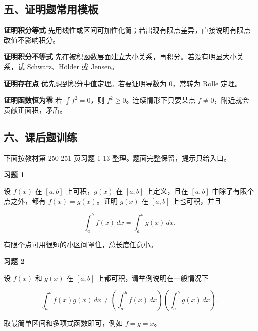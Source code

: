 \subsection*{五、证明题常用模板}

\begin{conceptbox}
\textbf{证明积分等式}
先用线性或区间可加性化简；若出现有限点差异，直接说明有限点改值不影响积分。
\end{conceptbox}

\begin{conceptbox}
\textbf{证明积分不等式}
先在被积函数层面建立大小关系，再积分。若没有明显大小关系，试 Schwarz、Hölder 或 Jensen。
\end{conceptbox}

\begin{conceptbox}
\textbf{证明存在点}
优先想到积分中值定理。若要证明导数为 \(0\)，常转为 Rolle 定理。
\end{conceptbox}

\begin{conceptbox}
\textbf{证明函数恒为零}
若 \(\int f^2=0\)，则 \(f^2\ge0\)。连续情形下只要某点 \(f\ne0\)，附近就会贡献正面积，矛盾。
\end{conceptbox}

\subsection*{六、课后题训练}

下面按教材第 250-251 页习题 1-13 整理。题面完整保留，提示只给入口。

\begin{exercisebox}
\textbf{习题 1 }

设 \(f(x)\) 在 \([a,b]\) 上可积，\(g(x)\) 在 \([a,b]\) 上定义，且在 \([a,b]\) 中除了有限个点之外，都有 \(f(x)=g(x)\)。证明 \(g(x)\) 在 \([a,b]\) 上也可积，并且

\[
        \int_a^b f(x)\,dx=\int_a^b g(x)\,dx.
      \]

\begin{hintbox}
有限个点可用很短的小区间罩住，总长度任意小。
\end{hintbox}
\end{exercisebox}

\begin{exercisebox}
\textbf{习题 2 }

设 \(f(x)\) 和 \(g(x)\) 在 \([a,b]\) 上都可积，请举例说明在一般情况下

\[
        \int_a^b f(x)g(x)\,dx
        \ne
        \left(\int_a^b f(x)\,dx\right)
        \left(\int_a^b g(x)\,dx\right).
      \]

\begin{hintbox}
取最简单区间和多项式函数即可，例如 \(f=g=x\)。
\end{hintbox}
\end{exercisebox}

